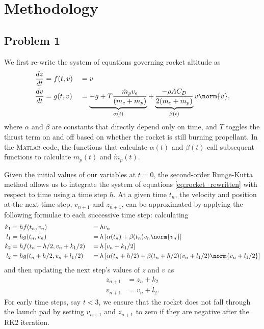 \documentclass[12pt]{article}
\begin{document}
\section{Methodology}

\subsection{Problem 1}

We first re-write the system of equations governing rocket altitude as
\begin{equation}
\begin{aligned}
\frac{dz}{dt} &= f(t,v) &&= v
\\
\frac{dv}{dt} &= g(t,v) &&= \underbrace{-g + T \frac{\dot{m}_p v_e}{(m_c + m_p)}}_{\alpha(t)} + \underbrace{\frac{- \rho A C_D}{2 (m_c + m_p)}}_{\beta(t)} v \norm{v}
,
\end{aligned}
\label{eq:rocket_rewritten}
\end{equation}
where $\alpha$ and $\beta$ are constants that directly depend only on time, and $T$ toggles the thrust term on and off based on whether the rocket is still burning propellant. In the \textsc{Matlab} code, the functions that calculate $\alpha(t)$ and $\beta(t)$ call subsequent functions to calculate $m_p(t)$ and $\dot{m}_p(t)$.

Given the initial values of our variables at $t=0$, the second-order Runge-Kutta method allows us to integrate the system of equations \eqref{eq:rocket_rewritten} with respect to time using a time step $h$. At a given time $t_n$, the velocity and position at the next time step, $v_{n+1}$ and $z_{n+1}$, can be approximated by applying the following formulae to each successive time step: calculating
\begin{equation}
\begin{aligned}
k_1 &= h f(t_n,v_n) &&= h v_n
\\
l_1 &= h g(t_n,v_n) &&= h \left[ \alpha(t_n) + \beta(t_n) v_n \norm{v_n} \right]
\\
k_2 &= h f(t_n + h/2, v_n + k_1 / 2) &&= h \left[ v_n + k_1/2\right]
\\
l_2 &= h g(t_n + h/2, v_n + l_1 / 2) &&= h \left[ \alpha(t_n + h/2) + \beta(t_n + h/2) (v_n + l_1 / 2) \norm{v_n + l_1 / 2} \right]
\end{aligned}
\end{equation}
and then updating the next step's values of $z$ and $v$ as
\begin{equation}
\begin{aligned}
z_{n+1} &= z_n + k_2
\\
v_{n+1} &= v_n + l_2
.
\end{aligned}
\end{equation}
For early time steps, say $t < 3$, we ensure that the rocket does not fall through the launch pad by setting $v_{n+1}$ and $z_{n+1}$ to zero if they are negative after the RK2 iteration.
\end{document}
